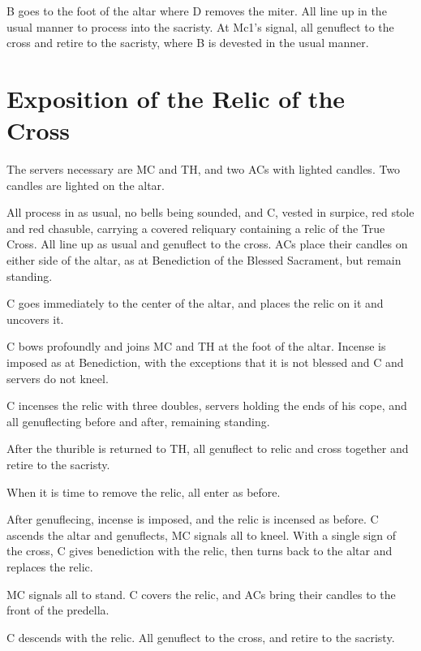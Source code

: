 {\rubric B goes to the foot of the altar where D removes the miter. All line up
in the usual manner to process into the sacristy. At Mc1's signal, all
genuflect to the cross and retire to the sacristy, where B is devested in the
usual manner.



\section{Exposition of the Relic of the Cross}

\rubric The servers necessary are MC and TH, and two ACs with lighted candles.
Two candles are lighted on the altar.

\rubric All process in as usual, no bells being sounded, and C, vested in
surpice, red stole and red chasuble, carrying a covered reliquary containing a
relic of the True Cross. All line up as usual and genuflect to the cross. ACs
place their candles on either side of the altar, as at Benediction of the
Blessed Sacrament, but remain standing.

\rubric C goes immediately to the center of the altar, and places the relic on
it and uncovers it.

\rubric C bows profoundly and joins MC and TH at the foot of the altar. Incense
is imposed as at Benediction, with the exceptions that it is not blessed and C
and servers do not kneel.

\rubric C incenses the relic with three doubles, servers holding the ends of
his cope, and all genuflecting before and after, remaining standing.

\rubric After the thurible is returned to TH, all genuflect to relic and cross
together and retire to the sacristy.

\rubric When it is time to remove the relic, all enter as before.

\rubric After genuflecing, incense is imposed, and the relic is incensed as
before. C ascends the altar and genuflects, MC signals all to kneel. With a
single sign of the cross, C gives benediction with the relic, then turns back
to the altar and replaces the relic.

\rubric MC signals all to stand. C covers the relic, and ACs bring their
candles to the front of the predella.

\rubric C descends with the relic. All genuflect to the cross, and retire to
the sacristy.

}


